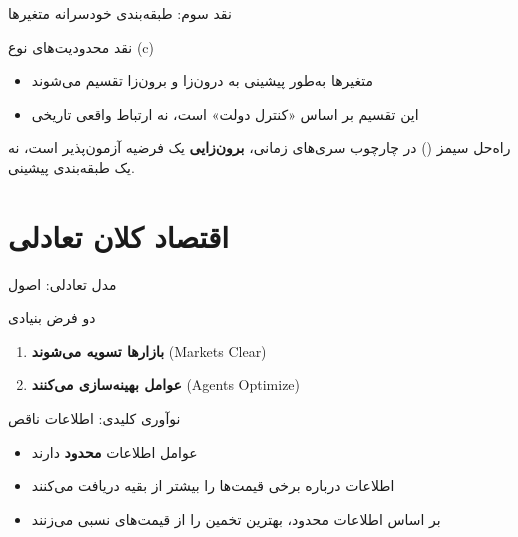 \documentclass[aspectratio=169,11pt]{beamer}
\newcommand{\highlight}[1]{\textcolor{AccentOrange}{\textbf{#1}}}
\newcommand{\keyword}[1]{\textcolor{MainBlue}{\textbf{#1}}}
\begin{document}
\begin{frame}{نقد سوم: طبقه‌بندی خودسرانه متغیرها}
	\begin{alertblock}{نقد محدودیت‌های نوع (c)}
		\begin{itemize}
			\item متغیرها به‌طور پیشینی به درون‌زا و برون‌زا تقسیم می‌شوند
			\item این تقسیم بر اساس «کنترل دولت» است، نه ارتباط واقعی تاریخی
		\end{itemize}
	\end{alertblock}
	\vspace{0.3cm}
	\begin{exampleblock}{راه‌حل سیمز ()}
		\centering
		در چارچوب سری‌های زمانی، \highlight{برون‌زایی} یک فرضیه آزمون‌پذیر است، نه یک طبقه‌بندی پیشینی.
	\end{exampleblock}
\end{frame}

\section{اقتصاد کلان تعادلی}

\begin{frame}{مدل تعادلی: اصول}
	\begin{block}{دو فرض بنیادی}
		\begin{enumerate}
			\item \keyword{بازارها تسویه می‌شوند} (Markets Clear)
			\item \keyword{عوامل بهینه‌سازی می‌کنند} (Agents Optimize)
		\end{enumerate}
	\end{block}
	\vspace{0.3cm}
	\begin{exampleblock}{نوآوری کلیدی: اطلاعات ناقص}
		\begin{itemize}
			\item عوامل اطلاعات \highlight{محدود} دارند
			\item اطلاعات درباره برخی قیمت‌ها را بیشتر از بقیه دریافت می‌کنند
			\item بر اساس اطلاعات محدود، بهترین تخمین را از قیمت‌های نسبی می‌زنند
		\end{itemize}
	\end{exampleblock}
\end{frame}
\end{document}
